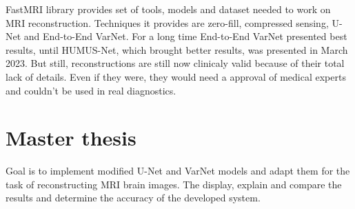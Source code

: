 \documentclass[10pt,a4paper]{article}
\begin{document}
FastMRI library provides set of tools, models and dataset needed to work on MRI reconstruction. Techniques it provides are zero-fill, compressed sensing, U-Net and End-to-End VarNet. For a long time End-to-End VarNet presented best results, until HUMUS-Net, which brought better results, was presented in March 2023. But still, reconstructions are still now clinicaly valid because of their total lack of details. Even if they were, they would need a approval of medical experts and couldn't be used in real diagnostics.

\section{Master thesis}

Goal is to implement modified U-Net and VarNet models and adapt them for the task of reconstructing MRI brain images. The display, explain and compare the results and determine the accuracy of the developed system.

\newpage
\end{document}
